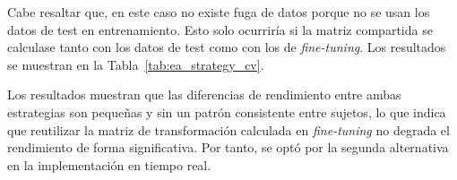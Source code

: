 Cabe resaltar que, en este caso no existe fuga de datos porque no se usan los datos de test en entrenamiento. Esto solo ocurriría si la matriz compartida se calculase tanto con los datos de test como con los de \textit{fine-tuning}. 
Los resultados se muestran en la Tabla~\ref{tab:ea_strategy_cv}.

\begin{table}[h]
    \centering
    \caption{Accuracy medio $\pm$ desviación típica en validación cruzada (5-Fold) para cada sujeto, comparando EA con matrices independientes por conjunto frente a EA con la matriz calculada en \textit{fine-tuning} reutilizada en test.}
    \label{tab:ea_strategy_cv}
\end{table}

Los resultados muestran que las diferencias de rendimiento entre ambas estrategias son pequeñas y sin un patrón consistente entre sujetos, lo que indica que reutilizar la matriz de transformación calculada en \textit{fine-tuning} no degrada el rendimiento de forma significativa. Por tanto, se optó por la segunda alternativa en la implementación en tiempo real.
